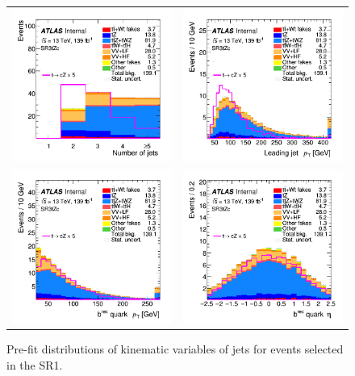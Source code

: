 \begin{figure}[]
	\centering
	\begin{tabular}{cc}
		\includegraphics[width=.35\textwidth]{Appendices/AP6/figures/SR3_UsingDL1rc/nJets} &
		\includegraphics[width=.35\textwidth]{Appendices/AP6/figures/SR3_UsingDL1rc/jet_pt} \\
		\includegraphics[width=.35\textwidth]{Appendices/AP6/figures/SR3_UsingDL1rc/b_pt} & 
		\includegraphics[width=.35\textwidth]{Appendices/AP6/figures/SR3_UsingDL1rc/b_eta} \\
	\end{tabular}
	\caption{Pre-fit distributions of kinematic variables of jets for events selected in the SR1\tZc.
		\ErrStatOnly
		\Blinded
	}%
	\label{fig:sel:sr1:jets}
\end{figure}

